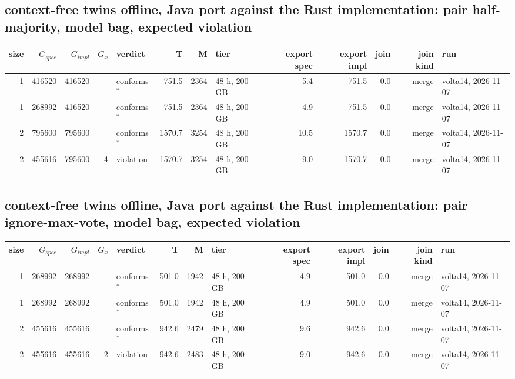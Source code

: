 \documentclass[10pt]{article}
\begin{document}
\subsection*{context-free twins offline, Java port against the Rust implementation: pair \textsf{half-majority}, model bag, expected violation}
\begin{longtable}{@{}rrrrlrrlrrrrl@{}}
\toprule
size & $G_{\mathit{spec}}$ & $G_{\mathit{impl}}$ & $G_x$ & verdict & T & M & tier & export spec & export impl & join & join kind & run \\
\midrule
\endhead
\color{red} 1 & 416520 & 416520 &  & conforms$^{\ast}$ & 751.5 & 2364 & 48 h, 200 GB & 5.4 & 751.5 & 0.0 & merge & volta14, 2026-11-07 \\
\color{red} 1 & 268992 & 416520 &  & conforms$^{\ast}$ & 751.5 & 2364 & 48 h, 200 GB & 4.9 & 751.5 & 0.0 & merge & volta14, 2026-11-07 \\
\color{red} 2 & 795600 & 795600 &  & conforms$^{\ast}$ & 1570.7 & 3254 & 48 h, 200 GB & 10.5 & 1570.7 & 0.0 & merge & volta14, 2026-11-07 \\
\color{red} 2 & 455616 & 795600 & 4 & violation & 1570.7 & 3254 & 48 h, 200 GB & 9.0 & 1570.7 & 0.0 & merge & volta14, 2026-11-07 \\
\bottomrule
\end{longtable}
\subsection*{context-free twins offline, Java port against the Rust implementation: pair \textsf{ignore-max-vote}, model bag, expected violation}
\begin{longtable}{@{}rrrrlrrlrrrrl@{}}
\toprule
size & $G_{\mathit{spec}}$ & $G_{\mathit{impl}}$ & $G_x$ & verdict & T & M & tier & export spec & export impl & join & join kind & run \\
\midrule
\endhead
\color{red} 1 & 268992 & 268992 &  & conforms$^{\ast}$ & 501.0 & 1942 & 48 h, 200 GB & 4.9 & 501.0 & 0.0 & merge & volta14, 2026-11-07 \\
\color{red} 1 & 268992 & 268992 &  & conforms$^{\ast}$ & 501.0 & 1942 & 48 h, 200 GB & 4.9 & 501.0 & 0.0 & merge & volta14, 2026-11-07 \\
\color{red} 2 & 455616 & 455616 &  & conforms$^{\ast}$ & 942.6 & 2479 & 48 h, 200 GB & 9.6 & 942.6 & 0.0 & merge & volta14, 2026-11-07 \\
\color{red} 2 & 455616 & 455616 & 2 & violation & 942.6 & 2483 & 48 h, 200 GB & 9.0 & 942.6 & 0.0 & merge & volta14, 2026-11-07 \\
\bottomrule
\end{longtable}
\end{document}
